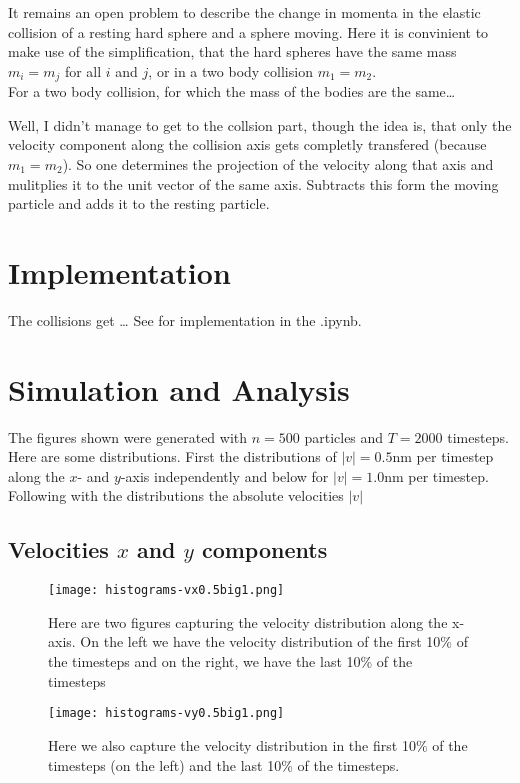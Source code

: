 \documentclass{article}
\begin{document}
    It remains an open problem to describe the change in momenta in the elastic collision of a resting hard sphere and a sphere moving. Here it is convinient to make use of the simplification, that the hard spheres have the same mass $m_i=m_j$ for all $i$ and $j$, or in a two body collision $m_1=m_2$. \\

    For a two body collision, for which the mass of the bodies are the same\dots

    Well, I didn't manage to get to the collsion part, though the idea is, that only the velocity component along the collision axis gets completly transfered (because $m_1=m_2$). So one determines the projection of the velocity along that axis and mulitplies it to the unit vector of the same axis. Subtracts this form the moving particle and adds it to the resting particle.

\section{Implementation}

The collisions get \dots
See for implementation in the .ipynb.

\section{Simulation and Analysis}
The figures shown were generated with $n=500$ particles and $T=2000$ timesteps.
Here are some distributions. First the distributions of $|v|=0.5$nm per timestep along the $x$- and $y$-axis independently and below for $|v|=1.0$nm per timestep. Following with the distributions the absolute velocities $|v|$  


\subsection{Velocities $x$ and $y$ components}
\begin{figure}[h]
    \centering
    \texttt{[image: histograms-vx0.5big1.png]}
    \caption{Here are two figures capturing the velocity distribution along the x-axis. On the left we have the velocity distribution of the first 10\% of the timesteps and on the right, we have the last 10\% of the timesteps}
    \label{figvx1}
\end{figure}

\begin{figure}[h!]
    \centering
    \texttt{[image: histograms-vy0.5big1.png]}
    \caption{Here we also capture the velocity distribution in the first 10\% of the timesteps (on the left) and the last 10\% of the timesteps.}
    \label{figvy1}
\end{figure}
\end{document}
